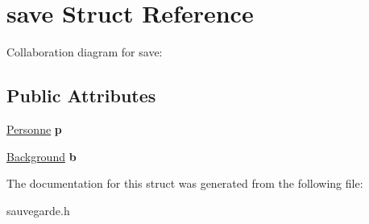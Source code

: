 \hypertarget{structsave}{}\section{save Struct Reference}
\label{structsave}


Collaboration diagram for save\+:
\subsection*{Public Attributes}
\begin{DoxyCompactItemize}
\item 
\hyperlink{structPersonne}{Personne} {\bfseries p}\hypertarget{structsave_a54cf187acf4e7bb90d8b18a06aa786de}{}\label{structsave_a54cf187acf4e7bb90d8b18a06aa786de}

\item 
\hyperlink{structBackground}{Background} {\bfseries b}\hypertarget{structsave_aa71ede6def656a451c46f6957a43ba77}{}\label{structsave_aa71ede6def656a451c46f6957a43ba77}

\end{DoxyCompactItemize}


The documentation for this struct was generated from the following file\+:\begin{DoxyCompactItemize}
\item 
sauvegarde.\+h\end{DoxyCompactItemize}
